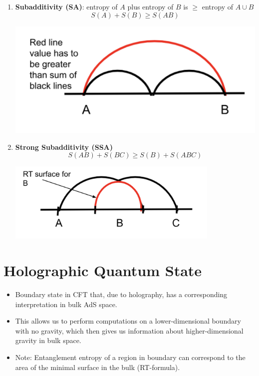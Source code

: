 \documentclass[12pt]{article}
\begin{document}
\begin{enumerate}
    \item \textbf{Subadditivity (SA)}: entropy of \( A \) plus entropy of \( B \) is \( \geq \) entropy of \( A \cup B \)
    \[
    S(A) + S(B) \geq S(AB)
    \]
    \begin{center}
        \includegraphics[width=\linewidth]{subaddivity.png}
    \end{center}
    
    \item \textbf{Strong Subadditivity (SSA)}
    \[
    S(AB) + S(BC) \geq S(B) + S(ABC)
    \]
    \begin{center}
        \includegraphics[width=0.8\textwidth]{strong_subaddivity.png}
    \end{center}
\end{enumerate}

\section*{Holographic Quantum State}
\begin{itemize}
    \item Boundary state in CFT that, due to holography, has a corresponding interpretation in bulk AdS space.
    \item This allows us to perform computations on a lower-dimensional boundary with no gravity, which then gives us information about higher-dimensional gravity in bulk space.
    \item Note: Entanglement entropy of a region in boundary can correspond to the area of the minimal surface in the bulk (RT-formula).
\end{itemize}
\end{document}
